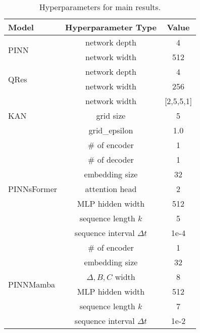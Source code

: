\begin{table}[H]
\vspace{-3mm}
  \caption{Hyperparameters for main results.}
  
  \centering
    \small
  \begin{tabular}{l|c|c}

    \toprule 
    Model & Hyperparameter Type & Value\\
    \midrule
   \multirow{ 2}{*}{PINN} & network depth & 4\\
   & network width & 512 \\
    \midrule
   \multirow{ 2}{*}{QRes}& network depth & 4 \\
    & network width & 256 \\
    \midrule
    \multirow{ 3}{*}{KAN}   & network width  & [2,5,5,1] \\
     & grid size & 5\\
       & grid\_epsilon  & 1.0 \\
       \midrule
        \multirow{ 7}{*}{PINNsFormer}   & \# of encoder  & 1 \\
     & \# of decoder & 1\\
       & embedding size  & 32 \\
        & attention head  & 2 \\
                & MLP hidden width  & 512 \\
            & sequence length $k$  & 5 \\
            & sequence interval $\Delta t$  & 1e-4 \\
            \midrule
            \multirow{ 7}{*}{PINNMamba}   & \# of encoder  & 1 \\
       & embedding size  & 32 \\
        & $\Delta,B,C$ width & 8 \\
                & MLP hidden width  & 512 \\
            & sequence length $k$  & 7 \\
            & sequence interval $\Delta t$  & 1e-2 \\
                
       

    \bottomrule
  \end{tabular}
  \normalsize
  \label{tab:hyperpara}

\end{table}